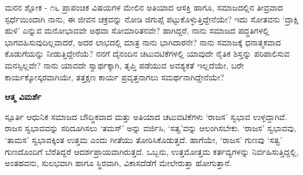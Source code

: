 \begin{mananam}{\mananamfont \large ಮನನ ಶ್ಲೋಕ - ೧೬}
\mananamtext
ಪ್ರಾಪಂಚಿಕ ವಿಷಯಗಳ ಮೇಲಿನ ಅತಿಯಾದ ಆಸಕ್ತಿ ಹಾಗೂ, ಸಮಾಜದಲ್ಲಿನ ತೀವ್ರವಾದ ಸ್ಪರ್ಧೆಯಿಂದಾಗಿ ನಾನು, ಈ ಜೀವನ ಚಕ್ರವನ್ನು ನೋಡಿ ಜಿಗುಪ್ಸೆ ಪಟ್ಟುಕೊಳ್ಳುತ್ತಿದ್ದೇನೆಯೇ? ಇದು ಸೋತವನು ‘ದ್ರಾಕ್ಷಿ ಹುಳಿ’ ಎನ್ನುವ ಮನೋಭಾವವೇ ಅಥವಾ ಸೋಮಾರಿತನವೇ? ಹಾಗಿದ್ದರೆ, ನಾನು ಸಮಾಜದ ಪದ್ಧತಿಗಳಲ್ಲಿ ಭಾಗವಹಿಸುವುದಿಲ್ಲವಾದರೆ, ಅದರ ಲಾಭದಲ್ಲಿ ಮಾತ್ರ ನಾನು ಭಾಗಿದಾರನೇ?  ನಾನು ಸಮಾಜಕ್ಕೆ ಧನಾತ್ಮಕವಾದ ಕೊಡುಗೆಯನ್ನು ನೀಡುತ್ತಿದ್ದೇನೆಯೆ? ನನಗೆ ದೈನಂದಿನ ಚಟುವಟಿಕೆಗಳಲ್ಲಿ ಯಾವುದೇ ನೈತಿಕ ಶಿಸ್ತನ್ನು ಪರಿಪಾಲಿಸುವ ಮನಸ್ಸಿಲ್ಲವೇ? ನಾನು ಯಾವದೇ ಸ್ವಾರ್ಥಕ್ಕಾಗಿ, ತೃಪ್ತಿ ಪಡೆಯುವ ಅವಶ್ಯಕತೆ ಇಲ್ಲದೆಯೇ,  ಬರೇ ಕಾರ್ಯಕ್ಕೋಸ್ಕರವಾಗಿಯೇ, ತತ್ತಕ್ಷಣ ಕಾರ್ಯ ಪ್ರವೃತ್ತನಾಗಲು ಸಮರ್ಥನಾಗಿದ್ದೇನೆಯೇ?
\end{mananam}
\WritingHand\enspace\textbf{ಆತ್ಮ ವಿಮರ್ಶೆ}\\
\begin{inspiration}{\mananamfont \large ಸ್ಪೂರ್ತಿ}
\mananamtext ಆಧುನಿಕ ಸಮಾಜದ ಬೌದ್ಧಿಕವಾದ ಮತ್ತು ಅತಿಯಾದ ಚಟುವಟಿಕೆಗಳು ‘ರಾಜಸ’ ಸ್ವಭಾವ ಉಳ್ಳದ್ದಾಗಿವೆ. ರಾಜಸ ಸ್ವಭಾವವನ್ನು ಸರಿದೂಗಿಸಲು ‘ತಮಸ್’ ಅನ್ನು ವರ್ಜಿಸಿ, ‘ಸತ್ವ’ವನ್ನು ಆಲಂಗಿಸಬೇಕು. ‘ರಾಜಸ’ ಸ್ವಭಾವವು, ‘ತಾಮಸ’ ಸ್ವಭಾವಕ್ಕಿಂತ ಉತ್ತಮ ಎಂದು ಗೀತೆಯು ತೋರಿಸಿಕೊಡುತ್ತದೆ. ಹಾಗೆಯೇ, ‘ರಾಜಸ’ ಗುಣವು ‘ಸತ್ವ’ ಗುಣದೊಂದಿಗೆ ಬೆರೆತಿದ್ದರೆ ಆದರ್ಶಪ್ರಾಯವಾಗಿರುತ್ತದೆ. ಒಬ್ಬನು, ಉತ್ತಮೋತ್ತಮ ಕರ್ತವ್ಯಗಳನ್ನು ನಿರ್ವಹಿಸುತ್ತಿದ್ದಲ್ಲಿ, ಅಂತಹವನು, ಸುಲಭವಾಗಿ ಹಾಗೂ ಸ್ಥಿರವಾಗಿ, ವಿಕಾಸದೆಡೆಗೆ ಮೇಲೇರುತ್ತಾ ಹೋಗುತ್ತಾನೆ.
\end{inspiration}
\newpage

